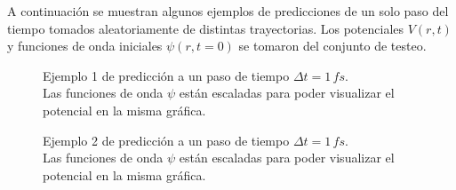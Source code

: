A continuación se muestran algunos ejemplos de predicciones de un solo paso del tiempo tomados aleatoriamente de distintas trayectorias. Los potenciales $V(r,t)$ y funciones de onda iniciales $\psi(r,t=0)$ se tomaron del conjunto de testeo.

\begin{figure}[H]
  \centering
  \caption{Ejemplo 1 de predicción a un paso de tiempo $\Delta t = 1\,fs$.\\ Las funciones de onda $\psi$ están escaladas para poder visualizar el potencial en la misma gráfica.}
  \label{fig:1step1}
\end{figure}

\begin{figure}[H]
  \centering
  \caption{Ejemplo 2 de predicción a un paso de tiempo $\Delta t = 1\,fs$.\\ Las funciones de onda $\psi$ están escaladas para poder visualizar el potencial en la misma gráfica.}
  \label{fig:1step2}
\end{figure}

